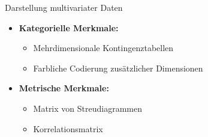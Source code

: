 \begin{concept}{Darstellung multivariater Daten}
\begin{itemize}
    \item \textbf{Kategorielle Merkmale:}
    \begin{itemize}
        \item Mehrdimensionale Kontingenztabellen
        \item Farbliche Codierung zusätzlicher Dimensionen
    \end{itemize}
    \item \textbf{Metrische Merkmale:}
    \begin{itemize}
        \item Matrix von Streudiagrammen
        \item Korrelationsmatrix
    \end{itemize}
\end{itemize}
\end{concept}